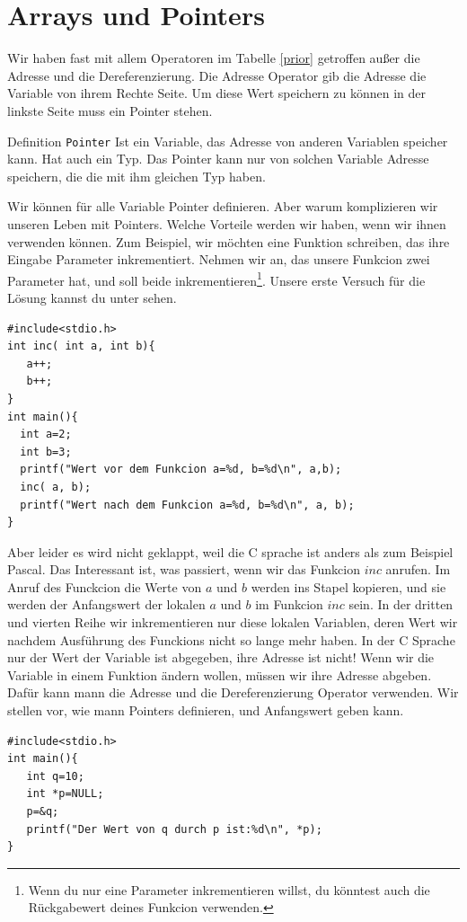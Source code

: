 
\section{Arrays und Pointers}

Wir haben fast mit allem Operatoren im Tabelle \ref{prior} getroffen außer die Adresse und die Dereferenzierung.
Die Adresse Operator gib die Adresse die Variable von ihrem Rechte Seite. Um diese Wert speichern zu können in 
der linkste Seite muss ein Pointer stehen.  

\begin{myblock}{Definition \texttt{Pointer}}
Ist ein Variable, das Adresse von anderen Variablen speicher kann. Hat auch ein Typ.
Das Pointer kann nur von solchen Variable Adresse speichern, die die mit ihm gleichen Typ haben.
\end{myblock}

Wir können für alle Variable Pointer definieren. Aber warum komplizieren wir unseren Leben mit Pointers.
Welche Vorteile werden wir haben, wenn wir ihnen verwenden können. Zum Beispiel, wir möchten 
eine Funktion schreiben, das ihre Eingabe Parameter inkrementiert. Nehmen wir an, das unsere
Funkcion zwei Parameter hat, und soll beide inkrementieren\footnote{Wenn du nur eine Parameter
inkrementieren willst, du könntest auch die Rückgabewert deines Funkcion verwenden.}.
Unsere erste Versuch für die Lösung kannst du unter sehen.

\begin{lstlisting}
#include<stdio.h>
int inc( int a, int b){
   a++;
   b++;
}
int main(){
  int a=2;
  int b=3;
  printf("Wert vor dem Funkcion a=%d, b=%d\n", a,b);
  inc( a, b);
  printf("Wert nach dem Funkcion a=%d, b=%d\n", a, b); 
}
\end{lstlisting}

Aber leider es wird nicht geklappt, weil die C sprache ist anders als zum Beispiel Pascal. 
Das Interessant ist, was passiert, wenn wir das Funkcion $inc$ anrufen. Im Anruf des Funckcion
die Werte von $a$ und $b$ werden ins Stapel kopieren, und sie werden der Anfangswert der lokalen
$a$ und $b$ im Funkcion $inc$ sein. In der dritten und vierten Reihe wir inkrementieren nur diese 
lokalen Variablen, deren Wert wir nachdem Ausführung des Funckions nicht so lange mehr haben.
In der C Sprache nur der Wert der Variable ist abgegeben, ihre Adresse ist nicht! Wenn
wir die Variable in einem Funktion ändern wollen, müssen wir ihre Adresse abgeben. Dafür 
kann mann die Adresse und die Dereferenzierung Operator verwenden. Wir stellen vor, wie
mann Pointers definieren, und Anfangswert geben kann.
\begin{lstlisting}
#include<stdio.h>
int main(){
   int q=10;
   int *p=NULL;
   p=&q;
   printf("Der Wert von q durch p ist:%d\n", *p);
}
\end{lstlisting}

